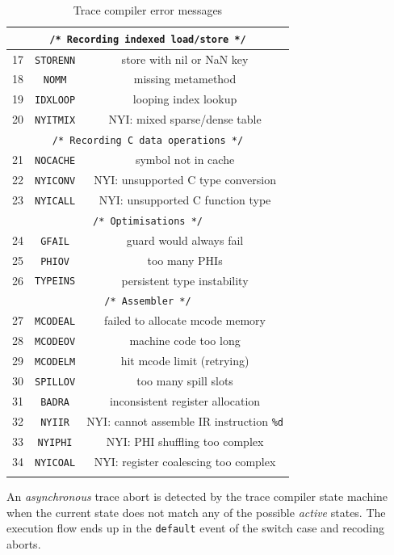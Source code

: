 \begin{center}
\begin{longtable}{|c|c|c|}
\hline
\multicolumn{3}{|c|}{\texttt{/* Recording indexed load/store */}}   \\
\hline
17 & \texttt{STORENN} &	store with nil or NaN key\\
18 & \texttt{NOMM} &	missing metamethod\\
19 & \texttt{IDXLOOP} &	looping index lookup\\
20 & \texttt{NYITMIX} &	NYI: mixed sparse/dense table\\
\hline
\multicolumn{3}{|c|}{\texttt{/* Recording C data operations */}}   \\
\hline
21 & \texttt{NOCACHE} &	symbol not in cache\\
22 & \texttt{NYICONV} &	NYI: unsupported C type conversion\\
23 & \texttt{NYICALL} &	NYI: unsupported C function type\\
\hline
\multicolumn{3}{|c|}{\texttt{/* Optimisations */}}   \\
\hline
24 & \texttt{GFAIL} &	guard would always fail\\
25 & \texttt{PHIOV} &	too many PHIs\\
26 & \texttt{TYPEINS}     &	persistent type instability\\
\hline
\multicolumn{3}{|c|}{\texttt{/* Assembler */}}   \\
\hline
27 & \texttt{MCODEAL} &	failed to allocate mcode memory\\
28 & \texttt{MCODEOV} &	machine code too long\\
29 & \texttt{MCODELM} &	hit mcode limit (retrying)\\
30 & \texttt{SPILLOV} &	too many spill slots\\
31 & \texttt{BADRA} &	inconsistent register allocation\\
32 & \texttt{NYIIR} &	NYI: cannot assemble IR instruction \texttt{\%d}\\
33 & \texttt{NYIPHI} &	NYI: PHI shuffling too complex\\
34 & \texttt{NYICOAL} &	NYI: register coalescing too complex\\
\hline
\caption{Trace compiler error messages}
\label{tab:abort-messages}
\end{longtable}
\end{center}
\noindent
An \textit{asynchronous} trace abort is detected by the trace compiler state machine when the current state does not match any of the possible \textit{active} states. The execution flow ends up in the \texttt{default} event of the switch case and recoding aborts.

